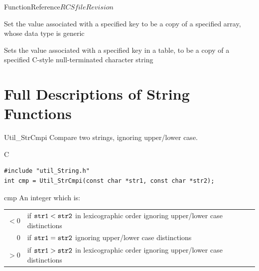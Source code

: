 \begin{cactuspart}{FunctionReference}{$RCSfile$}{$Revision$}
\begin{Lentry}
\item[Util\_TableSetGenericArray]
     [\pageref{Util-TableSetGenericArray}]
Set the value associated with a specified key to be a copy of a
specified array, whose data type is generic

\item[Util\_TableSetString]
     [\pageref{Util-TableSetString}]
Sets the value associated with a specified key in a table, to be
a copy of a specified C-style null-terminated character string

\end{Lentry}


\section{Full Descriptions of String Functions}


\begin{FunctionDescription}{Util\_StrCmpi}
\label{Util-StrCmpi}
Compare two strings, ignoring upper/lower case.

\begin{SynopsisSection}
\begin{Synopsis}{C}
\begin{verbatim}
#include "util_String.h"
int cmp = Util_StrCmpi(const char *str1, const char *str2);
\end{verbatim}
\end{Synopsis}
\end{SynopsisSection}

\begin{ResultSection}
\begin{Result}{cmp}
An integer which is:\\
\begin{tabular}{@{}rl}
$<0$	& if $\verb|str1| < \verb|str2|$ in lexicographic order
	  ignoring upper/lower case distinctions			\\
$0$	& if $\verb|str1| = \verb|str2|$
	  ignoring upper/lower case distinctions			\\
$>0$	& if $\verb|str1| > \verb|str2|$ in lexicographic order
	  ignoring upper/lower case distinctions			%
\end{tabular}
\end{Result}
\end{ResultSection}


\end{FunctionDescription}
\end{cactuspart}
